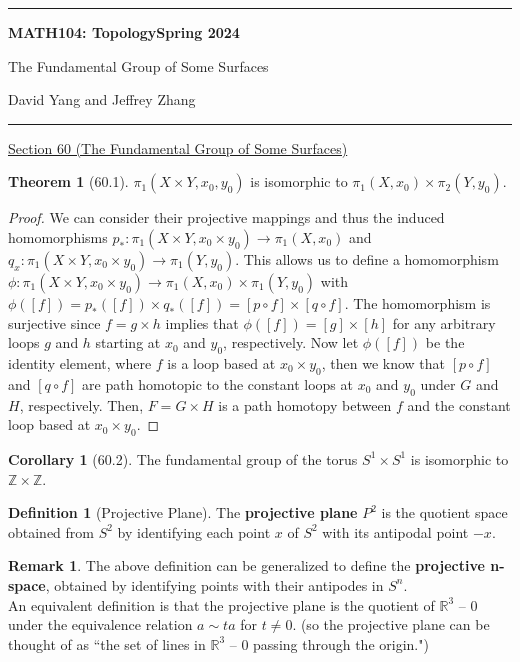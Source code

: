 \documentclass[11pt]{article}
\newcommand{\R}{\mathbb{R}}
\newcommand{\Z}{\mathbb{Z}}
\theoremstyle{definition}
\theoremstyle{theorem}
\newtheorem*{definition}{Definition}
\newtheorem*{theorem}{Theorem}
\newtheorem*{corollary}{Corollary}
\newtheorem*{remark}{Remark}
\begin{document}
	\hrule
	\begin{center}
        \textbf{MATH104: Topology}\hfill \textbf{Spring 2024}\newline

		{\Large The Fundamental Group of Some Surfaces}

		David Yang and Jeffrey Zhang
	\end{center}

\hrule

\vspace{1em}

\underline{Section 60 (The Fundamental Group of Some Surfaces)}
\begin{theorem}[60.1]
$\pi_1(X \times Y, x_0, y_0)$ is isomorphic to $\pi_1(X, x_0) \times \pi_2(Y, y_0)$. 
\end{theorem}
\begin{proof}
    We can consider their projective mappings and thus the induced homomorphisms $p_*:\pi_1(X\times Y, x_0\times y_0)\rightarrow\pi_1(X,x_0)$ and $q_x:\pi_1(X\times Y,x_0\times y_0)\rightarrow\pi_1(Y,y_0)$. This allows us to define a homomorphism $\phi:\pi_1(X\times Y, x_0\times y_0)\rightarrow\pi_1(X,x_0)\times \pi_1(Y,y_0)$ with $\phi([f])=p_*([f])\times q_*([f])=[p\circ f]\times [q\circ f]$. The homomorphism is surjective since $f=g\times h$ implies that $\phi([f])=[g]\times [h]$ for any arbitrary loops $g$ and $h$ starting at $x_0$ and $y_0$, respectively. Now let $\phi([f])$ be the identity element, where $f$ is a loop based at $x_0\times y_0$, then we know that $[p\circ f]$ and $[q\circ f]$ are path homotopic to the constant loops at $x_0$ and $y_0$ under $G$ and $H$, respectively. Then, $F=G\times H$ is a path homotopy between $f$ and the constant loop based at $x_0\times y_0$.
\end{proof}

\begin{corollary}[60.2]
The fundamental group of the torus $S^1 \times S^1$ is isomorphic to $\Z \times \Z$.
\end{corollary}

\begin{definition}[Projective Plane]
The \textbf{projective plane} $P^2$ is the quotient space obtained from $S^2$ by identifying each point $x$ of $S^2$ with its antipodal point $-x$.
\end{definition}

\begin{remark}
The above definition can be generalized to define the \textbf{projective n-space}, obtained by identifying points with their antipodes in $S^n$. \\

An equivalent definition is that the projective plane is the quotient of $\R^3 \text{ -- } 0$ under the equivalence relation $a \sim ta$ for $t \neq 0$. (so the projective plane can be thought of as ``the set of lines in $\R^3 \text{ -- } 0$ passing through the origin.")
\end{remark}
\end{document}
